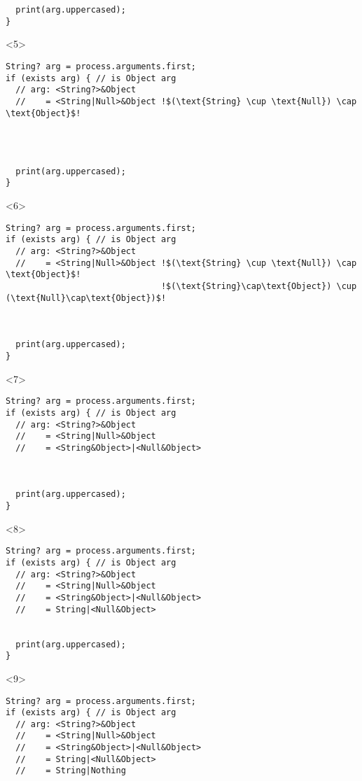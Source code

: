 \documentclass[aspectratio=169]{beamer}
\begin{document}
\begin{frame}[fragile]
\begin{onlyenv}
\begin{lstlisting}
  print(arg.uppercased);
}
    \end{lstlisting}
  \end{onlyenv}
  \begin{onlyenv}<5>
    \begin{lstlisting}[escapechar=!]
String? arg = process.arguments.first;
if (exists arg) { // is Object arg
  // arg: <String?>&Object
  //    = <String|Null>&Object !$(\text{String} \cup \text{Null}) \cap \text{Object}$!




  print(arg.uppercased);
}
    \end{lstlisting}
  \end{onlyenv}
  \begin{onlyenv}<6>
    \begin{lstlisting}[escapechar=!]
String? arg = process.arguments.first;
if (exists arg) { // is Object arg
  // arg: <String?>&Object
  //    = <String|Null>&Object !$(\text{String} \cup \text{Null}) \cap \text{Object}$!
                               !$(\text{String}\cap\text{Object}) \cup (\text{Null}\cap\text{Object})$!



  print(arg.uppercased);
}
    \end{lstlisting}
  \end{onlyenv}
  \begin{onlyenv}<7>
    \begin{lstlisting}
String? arg = process.arguments.first;
if (exists arg) { // is Object arg
  // arg: <String?>&Object
  //    = <String|Null>&Object
  //    = <String&Object>|<Null&Object>



  print(arg.uppercased);
}
    \end{lstlisting}
  \end{onlyenv}
  \begin{onlyenv}<8>
    \begin{lstlisting}
String? arg = process.arguments.first;
if (exists arg) { // is Object arg
  // arg: <String?>&Object
  //    = <String|Null>&Object
  //    = <String&Object>|<Null&Object>
  //    = String|<Null&Object>


  print(arg.uppercased);
}
    \end{lstlisting}
  \end{onlyenv}
  \begin{onlyenv}<9>
    \begin{lstlisting}
String? arg = process.arguments.first;
if (exists arg) { // is Object arg
  // arg: <String?>&Object
  //    = <String|Null>&Object
  //    = <String&Object>|<Null&Object>
  //    = String|<Null&Object>
  //    = String|Nothing


\end{lstlisting}
\end{onlyenv}
\end{frame}
\end{document}
